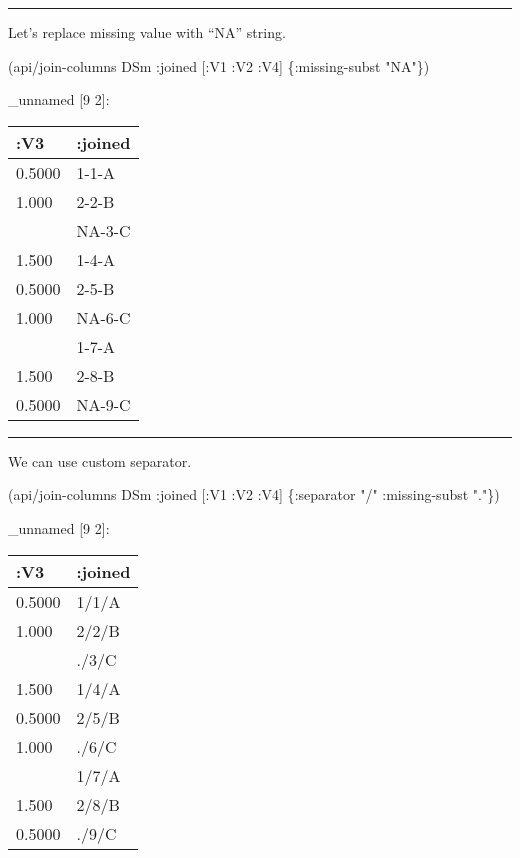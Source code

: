\documentclass[]{article}
\newenvironment{Shaded}{\begin{snugshade}}{\end{snugshade}}
\newcommand{\StringTok}[1]{\textcolor[rgb]{0.31,0.60,0.02}{#1}}
\newcommand{\AttributeTok}[1]{\textcolor[rgb]{0.77,0.63,0.00}{#1}}
\newcommand{\NormalTok}[1]{#1}
\begin{document}
\begin{center}\rule{0.5\linewidth}{0.5pt}\end{center}

Let's replace missing value with ``NA'' string.

\begin{Shaded}
\begin{Highlighting}[]
\NormalTok{(api/join-columns DSm }\AttributeTok{:joined}\NormalTok{ [}\AttributeTok{:V1} \AttributeTok{:V2} \AttributeTok{:V4}\NormalTok{] \{}\AttributeTok{:missing-subst} \StringTok{"NA"}\NormalTok{\})}
\end{Highlighting}
\end{Shaded}

\_unnamed {[}9 2{]}:

\begin{longtable}[]{@{}ll@{}}
\toprule
:V3 & :joined\tabularnewline
\midrule
\endhead
0.5000 & 1-1-A\tabularnewline
1.000 & 2-2-B\tabularnewline
& NA-3-C\tabularnewline
1.500 & 1-4-A\tabularnewline
0.5000 & 2-5-B\tabularnewline
1.000 & NA-6-C\tabularnewline
& 1-7-A\tabularnewline
1.500 & 2-8-B\tabularnewline
0.5000 & NA-9-C\tabularnewline
\bottomrule
\end{longtable}

\begin{center}\rule{0.5\linewidth}{0.5pt}\end{center}

We can use custom separator.

\begin{Shaded}
\begin{Highlighting}[]
\NormalTok{(api/join-columns DSm }\AttributeTok{:joined}\NormalTok{ [}\AttributeTok{:V1} \AttributeTok{:V2} \AttributeTok{:V4}\NormalTok{] \{}\AttributeTok{:separator} \StringTok{"/"}
                                             \AttributeTok{:missing-subst} \StringTok{"."}\NormalTok{\})}
\end{Highlighting}
\end{Shaded}

\_unnamed {[}9 2{]}:

\begin{longtable}[]{@{}ll@{}}
\toprule
:V3 & :joined\tabularnewline
\midrule
\endhead
0.5000 & 1/1/A\tabularnewline
1.000 & 2/2/B\tabularnewline
& ./3/C\tabularnewline
1.500 & 1/4/A\tabularnewline
0.5000 & 2/5/B\tabularnewline
1.000 & ./6/C\tabularnewline
& 1/7/A\tabularnewline
1.500 & 2/8/B\tabularnewline
0.5000 & ./9/C\tabularnewline
\bottomrule
\end{longtable}
\end{document}
